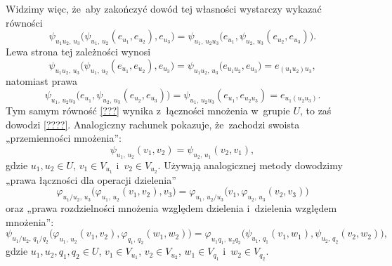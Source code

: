 \documentclass[a4paper,11pt]{article}
\begin{document}
Widzimy więc, że~aby zakończyć dowód tej własności wystarczy wykazać
równości
\begin{equation}
  \label{eq:Mechanika-Rozwazania-ogolne-14}
  \psi_{ u_{ 1 } u_{ 2 }, \, u_{ 3 } }\big(
  \psi_{ u_{ 1 }, \, u_{ 2 } }( e_{ u_{ 1 } }, e_{ u_{ 2 } } ), e_{ u_{ 3 } }
  \big)
  =
  \psi_{ u_{ 1 }, \, u_{ 2 } u_{ 3 } }\big(
  e_{ u_{ 1 } }, \psi_{ u_{ 2 }, \, u_{ 3 } }( e_{ u_{ 2 } }, e_{ u_{ 3 } } )
  \big).
\end{equation}
Lewa strona tej zależności wynosi
\begin{equation}
  \label{eq:Mechanika-Rozwazania-ogolne-15}
  \psi_{ u_{ 1 } u_{ 2 }, \, u_{ 3 } }\big(
  \psi_{ u_{ 1 }, \, u_{ 2 } }( e_{ u_{ 1 } }, e_{ u_{ 2 } } ), e_{ u_{ 3 } }
  \big) =
  \psi_{ u_{ 1 } u_{ 2 }, \, u_{ 3 } }\big( e_{ u_{ 1 } u_{ 2 } }, e_{ u_{ 3 } }
  \big) =
  e_{ ( u_{ 1 } u_{ 2 } ) u_{ 3 } },
\end{equation}
natomiast prawa
\begin{equation}
  \label{eq:Arnold-MetodyMatematyczneETC-01}
  \psi_{ u_{ 1 }, \, u_{ 2 } u_{ 3 } }\big(
  e_{ u_{ 1 } }, \psi_{ u_{ 2 }, \, u_{ 3 } }( e_{ u_{ 2 } }, e_{ u_{ 3 } } )
  \big) =
  \psi_{ u_{ 1 }, \, u_{ 2 } u_{ 3 } }( e_{ u_{ 1 } }, e_{ u_{ 2 } u_{ 3 } } ) =
  e_{ u_{ 1 } ( u_{ 2 } u_{ 3 } ) }.
\end{equation}
Tym samym równość \eqref{???} wynika z~łączności mnożenia w~grupie $U$,
to zaś dowodzi \eqref{????}. Analogiczny rachunek pokazuje, że~zachodzi
swoista „przemienności mnożenia”:
\begin{equation}
  \label{eq:Arnold-MetodyMatematyczneETC-01}
  \psi_{ u_{ 1 }, \, u_{ 2 } }( v_{ 1 }, v_{ 2 } ) =
  \psi_{ u_{ 2 }, \, u_{ 1 } }( v_{ 2 }, v_{ 1 } ),
\end{equation}
gdzie $u_{ 1 }, u_{ 2 } \in U$, $v_{ 1 } \in V_{ u_{ 1 } }$
i~$v_{ 2 } \in V_{ u_{ 2 } }$. Używają analogicznej metody dowodzimy
„prawa łączności dla operacji dzielenia”
\begin{equation}
  \label{eq:Arnold-MetodyMatematyczneETC-01}
  \varphi_{ u_{ 1 } / u_{ 2 }, \, u_{ 3 } }\big(
  \varphi_{ u_{ 1 }, \, u_{ 2 } }( v_{ 1 }, v_{ 2 } ), v_{ 3 } \big) =
  \varphi_{ u_{ 1 }, \, u_{ 2 } / u_{ 3 } }\big(
  v_{ 1 }, \varphi_{ u_{ 2 }, \, u_{ 3 } }( v_{ 2 }, v_{ 3 } ) \big)
\end{equation}
oraz „prawa rozdzielności mnożenia względem dzielenia i~dzielenia
względem mnożenia”:
\begin{equation}
  \label{eq:Arnold-MetodyMatematyczneETC-01}
  \psi_{ u_{ 1 } / u_{ 2 }, \, q_{ 1 } / q_{ 2 } }\big(
  \varphi_{ u_{ 1 }, \, u_{ 2 } }( v_{ 1 }, v_{ 2 } ),
  \varphi_{ q_{ 1 }, \, q_{ 2 } }( w_{ 1 }, w_{ 2 } ) \big) =
  \varphi_{ u_{ 1 } q_{ 1 }, \, u_{ 2 } q_{ 2 } }\big(
  \psi_{ u_{ 1 }, \, q_{ 1 } }( v_{ 1 }, w_{ 1 } ),
  \psi_{ u_{ 2 }, \, q_{ 2 } }( v_{ 2 }, w_{ 2 } ) \big),
\end{equation}
gdzie $u_{ 1 }, u_{ 2 }, q_{ 1 }, q_{ 2 } \in U$, $v_{ 1 } \in V_{ u_{ 1 } }$,
$v_{ 2 } \in V_{ u_{ 2 } }$, $w_{ 1 } \in V_{ q_{ 1 } }$ i~$w_{ 2 } \in V_{ q_{ 2 } }$.
\end{document}
